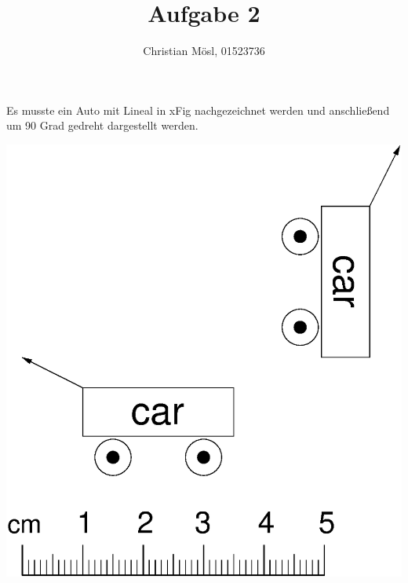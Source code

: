 \documentclass{article}
\author{Christian M\"osl, 01523736}
\title{Aufgabe 2}
\date{}
\begin{document}
\maketitle

\paragraph{}
Es musste ein Auto mit Lineal in xFig nachgezeichnet werden und anschließend um 90 Grad gedreht dargestellt werden.
\vspace{1cm}

\centering
\includegraphics[scale=0.5]{car.eps}
\end{document}
